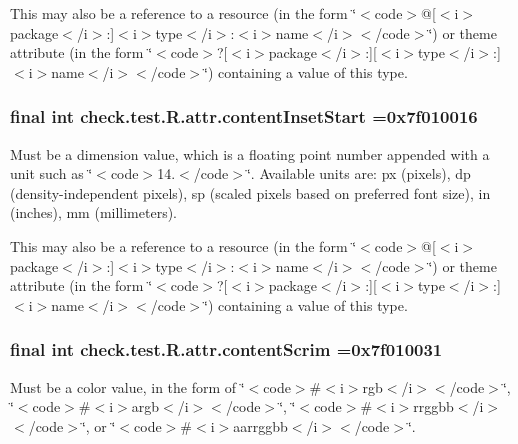 This may also be a reference to a resource (in the form \char`\"{}$<$code$>$@\mbox{[}$<$i$>$package$<$/i$>$\+:\mbox{]}$<$i$>$type$<$/i$>$\+:$<$i$>$name$<$/i$>$$<$/code$>$\char`\"{}) or theme attribute (in the form \char`\"{}$<$code$>$?\mbox{[}$<$i$>$package$<$/i$>$\+:\mbox{]}\mbox{[}$<$i$>$type$<$/i$>$\+:\mbox{]}$<$i$>$name$<$/i$>$$<$/code$>$\char`\"{}) containing a value of this type. \hypertarget{classcheck_1_1test_1_1_r_1_1attr_aff1a02632be3b62d04d2aff4c7f17b43}{}
\subsubsection[{content\+Inset\+Start}]{\setlength{\rightskip}{0pt plus 5cm}final int check.\+test.\+R.\+attr.\+content\+Inset\+Start =0x7f010016\hspace{0.3cm}{\ttfamily [static]}}\label{classcheck_1_1test_1_1_r_1_1attr_aff1a02632be3b62d04d2aff4c7f17b43}
Must be a dimension value, which is a floating point number appended with a unit such as \char`\"{}$<$code$>$14.\+5sp$<$/code$>$\char`\"{}. Available units are\+: px (pixels), dp (density-\/independent pixels), sp (scaled pixels based on preferred font size), in (inches), mm (millimeters). 

This may also be a reference to a resource (in the form \char`\"{}$<$code$>$@\mbox{[}$<$i$>$package$<$/i$>$\+:\mbox{]}$<$i$>$type$<$/i$>$\+:$<$i$>$name$<$/i$>$$<$/code$>$\char`\"{}) or theme attribute (in the form \char`\"{}$<$code$>$?\mbox{[}$<$i$>$package$<$/i$>$\+:\mbox{]}\mbox{[}$<$i$>$type$<$/i$>$\+:\mbox{]}$<$i$>$name$<$/i$>$$<$/code$>$\char`\"{}) containing a value of this type. \hypertarget{classcheck_1_1test_1_1_r_1_1attr_ae9b64be1267d0d817f88a850226d571f}{}
\subsubsection[{content\+Scrim}]{\setlength{\rightskip}{0pt plus 5cm}final int check.\+test.\+R.\+attr.\+content\+Scrim =0x7f010031\hspace{0.3cm}{\ttfamily [static]}}\label{classcheck_1_1test_1_1_r_1_1attr_ae9b64be1267d0d817f88a850226d571f}
Must be a color value, in the form of \char`\"{}$<$code$>$\#$<$i$>$rgb$<$/i$>$$<$/code$>$\char`\"{}, \char`\"{}$<$code$>$\#$<$i$>$argb$<$/i$>$$<$/code$>$\char`\"{}, \char`\"{}$<$code$>$\#$<$i$>$rrggbb$<$/i$>$$<$/code$>$\char`\"{}, or \char`\"{}$<$code$>$\#$<$i$>$aarrggbb$<$/i$>$$<$/code$>$\char`\"{}. 

